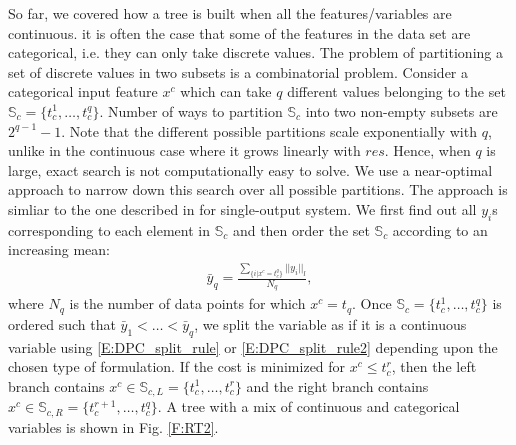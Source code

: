 So far, we covered how a tree is built when all the features/variables are continuous. it is often the case that some of the features in the data set are categorical, i.e. they can only take discrete values. 
The problem of partitioning a set of discrete values in two subsets is a combinatorial problem. Consider a categorical input feature $x^c$ which can take $q$ different values belonging to the set $\mathbb{S}_c=\{t_c^1,\dots,t_c^q \}$. Number of ways to partition $\mathbb{S}_c$ into two non-empty subsets are $2^{q-1}-1$. Note that the different possible partitions scale exponentially with $q$, unlike in the continuous case where it grows linearly with $res$. Hence, when $q$ is large, exact search is not computationally easy to solve. We use a near-optimal approach to narrow down this search over all possible partitions. The approach is simliar to the one described in \cite{Ripley2007} for single-output system. We first find out all $y_i$s corresponding to each element in $\mathbb{S}_c$ and then order the set $\mathbb{S}_c$ according to an increasing mean:
\begin{gather}
\label{E:DPC_cat_split_rule}
\bar{y}_q = \frac{\displaystyle\sum_{\{i|x^c=t_c^q\}} ||y_i||_l}{N_q},
\end{gather}
where $N_q$ is the number of data points for which $x^c=t_q$. Once $\mathbb{S}_c=\{t_c^1,\dots,t_c^q \}$ is ordered such that 
$\bar{y}_1< \dots < \bar{y}_q$, we split the variable as if it is a continuous variable using \eqref{E:DPC_split_rule} or \eqref{E:DPC_split_rule2} depending upon the chosen type of formulation. If the cost is minimized for $x^c \leq t_c^r$, then the left branch contains $x^c \in \mathbb{S}_{c,L} = \{ t_c^1,\dots,t_c^r \}$ and the right branch contains $x^c \in \mathbb{S}_{c,R} = \{ t_c^{r+1},\dots,t_c^q \}$. A tree with a mix of continuous and categorical variables is shown in Fig. \ref{F:RT2}. 

